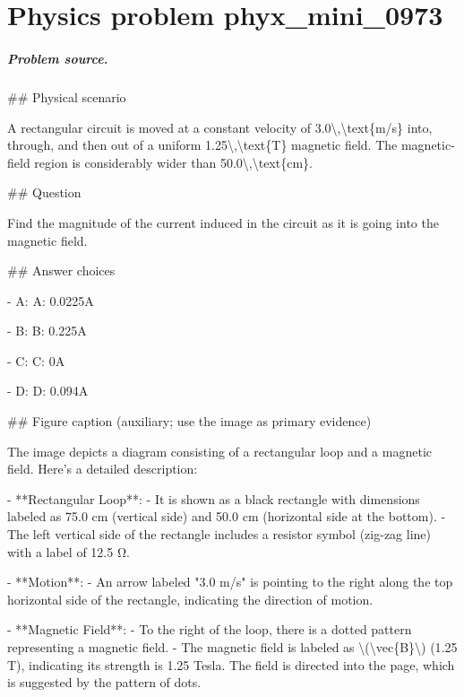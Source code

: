 
\chapter{Physics problem phyx\_mini\_0973}
\label{ch:PhyXMiniProblems_problem_phyx_mini_0973}

\paragraph{Problem source.}
\#\# Physical scenario

A rectangular circuit is moved at a constant velocity of 3.0\textbackslash{},\textbackslash{}text\{m/s\} into, through, and then out of a uniform 1.25\textbackslash{},\textbackslash{}text\{T\} magnetic field. The magnetic-field region is considerably wider than 50.0\textbackslash{},\textbackslash{}text\{cm\}.

\#\# Question

Find the magnitude of the current induced in the circuit as it is going into the magnetic field.

\#\# Answer choices

- A: A: 0.0225A

- B: B: 0.225A

- C: C: 0A

- D: D: 0.094A

\#\# Figure caption (auxiliary; use the image as primary evidence)

The image depicts a diagram consisting of a rectangular loop and a magnetic field. Here's a detailed description:

- **Rectangular Loop**: 
  - It is shown as a black rectangle with dimensions labeled as 75.0 cm (vertical side) and 50.0 cm (horizontal side at the bottom).
  - The left vertical side of the rectangle includes a resistor symbol (zig-zag line) with a label of 12.5 Ω.

- **Motion**:
  - An arrow labeled "3.0 m/s" is pointing to the right along the top horizontal side of the rectangle, indicating the direction of motion.

- **Magnetic Field**:
  - To the right of the loop, there is a dotted pattern representing a magnetic field. 
  - The magnetic field is labeled as \textbackslash{}(\textbackslash{}vec\{B\}\textbackslash{}) (1.25 T), indicating its strength is 1.25 Tesla. The field is directed into the page, which is suggested by the pattern of dots.


